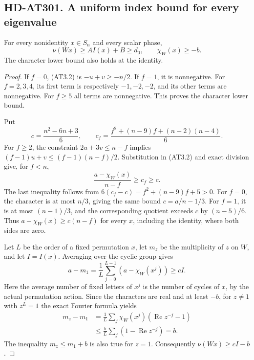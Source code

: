 \subsection*{HD-AT301. A uniform index bound for every eigenvalue}

\begin{lemma}[HD-AT301]
For every nonidentity $x\in S_n$ and every scalar phase,
\[
                 \nu(Wx)\ge A I(x)+B\ge d_0,
 \qquad \chi_W(x)\ge-b.                                \tag{AT3.3}
\]
The character lower bound also holds at the identity.
\end{lemma}

\begin{proof}
If $f=0$, (AT3.2) is $-u+v\ge-n/2$.  If $f=1$, it is
nonnegative.  For $f=2,3,4$, its first term is respectively
$-1,-2,-2$, and its other terms are nonnegative.  For $f\ge5$
all terms are nonnegative.  This proves the character lower bound.

Put
\[
 c=\frac{n^2-6n+3}6,\qquad
 c_f=\frac{f^2+(n-9)f+(n-2)(n-4)}6.                     \tag{AT3.4}
\]
For $f\ge2$, the constraint $2u+3v\le n-f$ implies
$(f-1)u+v\le(f-1)(n-f)/2$.  Substitution in (AT3.2)
and exact division give, for $f<n$,
\[
             \frac{a-\chi_W(x)}{n-f}\ge c_f\ge c.
                                                                  \tag{AT3.5}
\]
The last inequality follows from
$6(c_f-c)=f^2+(n-9)f+5>0$.
For $f=0$, the character is at most $n/3$, giving the same
bound $c=a/n-1/3$.  For $f=1$, it is at most $(n-1)/3$,
and the corresponding quotient exceeds $c$ by $(n-5)/6$.
Thus $a-\chi_W(x)\ge c(n-f)$ for every $x$, including the
identity, where both sides are zero.

Let $L$ be the order of a fixed permutation $x$, let $m_z$
be the multiplicity of $z$ on $W$, and let $I=I(x)$.
Averaging over the cyclic group gives
\[
 a-m_1=\frac1L\sum_{j=0}^{L-1}(a-\chi_W(x^j))\ge cI.
                                                                  \tag{AT3.6}
\]
Here the average number of fixed letters of $x^j$ is the
number of cycles of $x$, by the actual permutation action.
Since the characters are real and at least $-b$, for $z\ne1$
with $z^L=1$ the exact Fourier formula yields
\[
 \begin{split}
 m_z-m_1
 &=\frac1L\sum_j\chi_W(x^j)(\operatorname{Re}z^{-j}-1)\\
 &\le\frac bL\sum_j(1-\operatorname{Re}z^{-j})=b.
 \end{split}                                                   \tag{AT3.7}
\]
The inequality $m_z\le m_1+b$ is also true for $z=1$.
Consequently $\nu(Wx)\ge cI-b$.


\end{proof}
